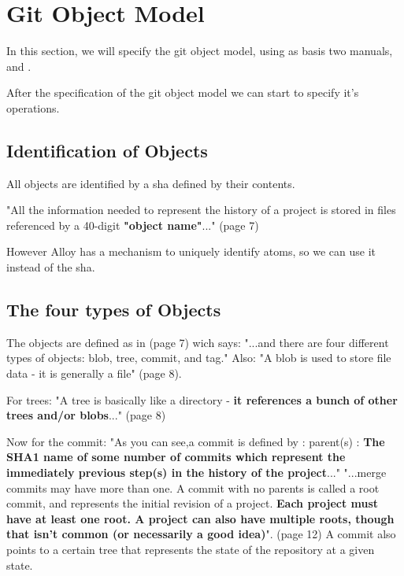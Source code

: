 \section{Git Object Model}

In this section, we will specify the git object model, using as
basis two manuals, \cite{gitComm} and \cite{progit}. \par
After the specification of the git object model we can start
to specify it's operations. \par

\subsection{Identification of Objects}
All objects are identified by a sha defined by their contents. \par
"All the information needed to represent the history
of a project is stored in files referenced by a 
40-digit {\bf "object name"}..." (page 7) \par

However Alloy has a mechanism to uniquely identify atoms, so 
we can use it instead of the sha. \par

\subsection{The four types of Objects}
The objects are defined as in \cite{gitComm} (page 7) wich says: 
"...and there are four different types of objects: blob,
tree, commit, and tag."
Also: "A blob is used to store file data - it is generally a file" 
\cite{gitComm} (page 8). \par
For trees: "A tree is basically like a directory - {\bf it references a bunch
of other trees and/or blobs}..." (page 8) \par 

Now for the commit:  
"As you can see,a commit is defined by : 
parent(s) : {\bf The SHA1 name of some number of commits which
represent the immediately previous step(s) in the 
history of the project}..."
"...merge commits may have more than one. A commit with no 
parents is called a root commit, and represents the 
initial revision of a project. {\bf Each project must have at
least one root. A project can also have multiple roots,
though that isn't common (or necessarily a good idea)}". \cite{gitComm} (page 12)
A commit also points to a certain tree that represents the state of the repository
at a given state. \par

